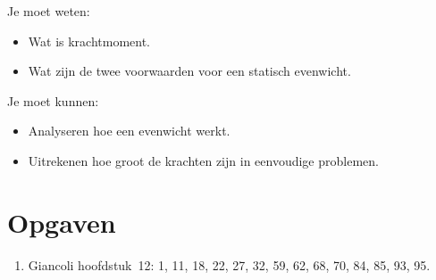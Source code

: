 Je moet weten:
\begin{itemize}
\item Wat is krachtmoment.
\item Wat zijn de twee voorwaarden voor een statisch evenwicht.
\end{itemize}
Je moet kunnen:
\begin{itemize}
\item Analyseren hoe een evenwicht werkt.
\item Uitrekenen hoe groot de krachten zijn in eenvoudige problemen.
\end{itemize}

\section{Opgaven}

\begin{enumerate}
\item Giancoli hoofdstuk~12: 1, 11, 18, 22, 27, 32, 59, 62, 68, 70, 84, 85, 93, 95.
\end{enumerate}

